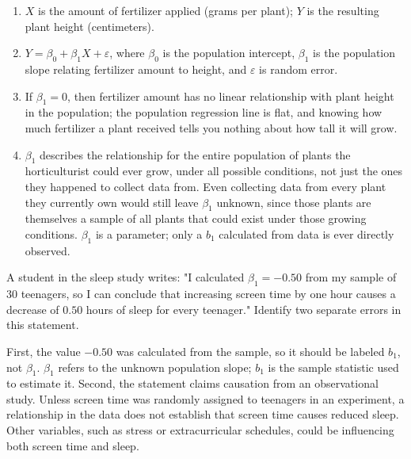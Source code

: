 \begin{Answer}[ref={ex:slope-model-1}]
\begin{enumerate}
    \item $X$ is the amount of fertilizer applied (grams per plant); $Y$ is the resulting plant height (centimeters).
    \item $Y = \beta_0 + \beta_1 X + \varepsilon$, where $\beta_0$ is the population intercept, $\beta_1$ is the population slope relating fertilizer amount to height, and $\varepsilon$ is random error.
    \item If $\beta_1 = 0$, then fertilizer amount has no linear relationship with plant height in the population; the population regression line is flat, and knowing how much fertilizer a plant received tells you nothing about how tall it will grow.
    \item $\beta_1$ describes the relationship for the entire population of plants the horticulturist could ever grow, under all possible conditions, not just the ones they happened to collect data from. Even collecting data from every plant they currently own would still leave $\beta_1$ unknown, since those plants are themselves a sample of all plants that could exist under those growing conditions. $\beta_1$ is a parameter; only a $b_1$ calculated from data is ever directly observed.
\end{enumerate}
\end{Answer}

\begin{Exercise}[title={Spot the Error}, label={ex:slope-model-2}]
A student in the sleep study writes: "I calculated $\beta_1 = -0.50$ from my sample of 30 teenagers, so I can conclude that increasing screen time by one hour causes a decrease of $0.50$ hours of sleep for every teenager." Identify two separate errors in this statement.
\end{Exercise}

\begin{Answer}[ref={ex:slope-model-2}]
First, the value $-0.50$ was calculated from the sample, so it should be labeled $b_1$, not $\beta_1$. $\beta_1$ refers to the unknown population slope; $b_1$ is the sample statistic used to estimate it. Second, the statement claims causation from an observational study. Unless screen time was randomly assigned to teenagers in an experiment, a relationship in the data does not establish that screen time causes reduced sleep. Other variables, such as stress or extracurricular schedules, could be influencing both screen time and sleep.
\end{Answer}

